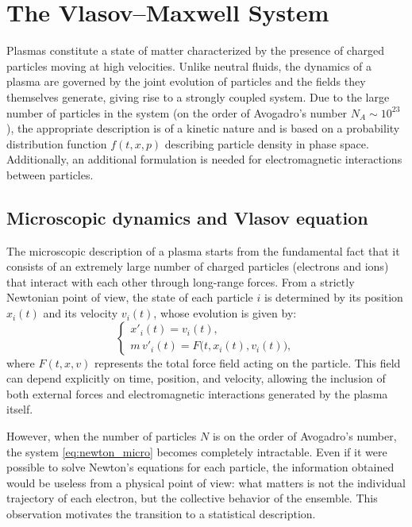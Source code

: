 \documentclass[11pt,a4paper,twoside,pdf]{article}
\numberwithin{equation}{section}
\begin{document}
\newpage

\section{The Vlasov--Maxwell System}

Plasmas constitute a state of matter characterized by the presence of charged particles moving at high velocities. Unlike neutral fluids, the dynamics of a plasma are governed by the joint evolution of particles and the fields they themselves generate, giving rise to a strongly coupled system. Due to the large number of particles in the system (on the order of Avogadro's number $N_A \sim 10^{23}$), the appropriate description is of a kinetic nature and is based on a probability distribution function $f(t,x,p)$ describing particle density in phase space. Additionally, an additional formulation is needed for electromagnetic interactions between particles.








\subsection{Microscopic dynamics and Vlasov equation}

The microscopic description of a plasma starts from the fundamental fact that it consists of an extremely large number of charged particles (electrons and ions) that interact with each other through long-range forces. From a strictly Newtonian point of view, the state of each particle $i$ is determined by its position $x_i(t)$ and its velocity $v_i(t)$, whose evolution is given by:
\begin{equation}
\begin{cases}
x'_i(t) = v_i(t), \\[0.3em]
m\, v'_i(t) = F\big(t,x_i(t),v_i(t)\big),
\end{cases}
\label{eq:newton_micro}
\end{equation}
where $F(t,x,v)$ represents the total force field acting on the particle. This field can depend explicitly on time, position, and velocity, allowing the inclusion of both external forces and electromagnetic interactions generated by the plasma itself.

However, when the number of particles $N$ is on the order of Avogadro's number, the system \eqref{eq:newton_micro} becomes completely intractable. Even if it were possible to solve Newton's equations for each particle, the information obtained would be useless from a physical point of view: what matters is not the individual trajectory of each electron, but the collective behavior of the ensemble. This observation motivates the transition to a statistical description.
\end{document}

